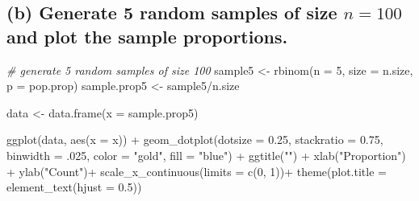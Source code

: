 \documentclass[
]{book}
\newenvironment{Shaded}{\begin{snugshade}}{\end{snugshade}}
\newcommand{\AttributeTok}[1]{\textcolor[rgb]{0.77,0.63,0.00}{#1}}
\newcommand{\CommentTok}[1]{\textcolor[rgb]{0.56,0.35,0.01}{\textit{#1}}}
\newcommand{\DecValTok}[1]{\textcolor[rgb]{0.00,0.00,0.81}{#1}}
\newcommand{\FloatTok}[1]{\textcolor[rgb]{0.00,0.00,0.81}{#1}}
\newcommand{\FunctionTok}[1]{\textcolor[rgb]{0.00,0.00,0.00}{#1}}
\newcommand{\NormalTok}[1]{#1}
\newcommand{\OtherTok}[1]{\textcolor[rgb]{0.56,0.35,0.01}{#1}}
\newcommand{\SpecialCharTok}[1]{\textcolor[rgb]{0.00,0.00,0.00}{#1}}
\newcommand{\StringTok}[1]{\textcolor[rgb]{0.31,0.60,0.02}{#1}}
\begin{document}
\hypertarget{b-generate-5-random-samples-of-size-n-100-and-plot-the-sample-proportions.}{%
\subsection{\texorpdfstring{(b) Generate 5 random samples of size \(n= 100\) and plot the sample proportions.}{(b) Generate 5 random samples of size n= 100 and plot the sample proportions.}}\label{b-generate-5-random-samples-of-size-n-100-and-plot-the-sample-proportions.}}

\begin{Shaded}
\begin{Highlighting}[]
\CommentTok{\# generate 5 random samples of size 100}
\NormalTok{sample5 }\OtherTok{\textless{}{-}} \FunctionTok{rbinom}\NormalTok{(}\AttributeTok{n =} \DecValTok{5}\NormalTok{, }\AttributeTok{size =}\NormalTok{ n.size, }\AttributeTok{p =}\NormalTok{ pop.prop)  }
\NormalTok{sample.prop5 }\OtherTok{\textless{}{-}}\NormalTok{ sample5}\SpecialCharTok{/}\NormalTok{n.size }

\NormalTok{data }\OtherTok{\textless{}{-}} \FunctionTok{data.frame}\NormalTok{(}\AttributeTok{x =}\NormalTok{ sample.prop5)}

\FunctionTok{ggplot}\NormalTok{(data, }\FunctionTok{aes}\NormalTok{(}\AttributeTok{x =}\NormalTok{ x)) }\SpecialCharTok{+}
   \FunctionTok{geom\_dotplot}\NormalTok{(}\AttributeTok{dotsize =} \FloatTok{0.25}\NormalTok{,}
               \AttributeTok{stackratio =} \FloatTok{0.75}\NormalTok{,}
               \AttributeTok{binwidth =}\NormalTok{ .}\DecValTok{025}\NormalTok{,}
               \AttributeTok{color =} \StringTok{"gold"}\NormalTok{,}
               \AttributeTok{fill =} \StringTok{"blue"}\NormalTok{) }\SpecialCharTok{+}
  \FunctionTok{ggtitle}\NormalTok{(}\StringTok{""}\NormalTok{) }\SpecialCharTok{+}  \FunctionTok{xlab}\NormalTok{(}\StringTok{"Proportion"}\NormalTok{) }\SpecialCharTok{+} \FunctionTok{ylab}\NormalTok{(}\StringTok{"Count"}\NormalTok{)}\SpecialCharTok{+}
  \FunctionTok{scale\_x\_continuous}\NormalTok{(}\AttributeTok{limits =} \FunctionTok{c}\NormalTok{(}\DecValTok{0}\NormalTok{, }\DecValTok{1}\NormalTok{))}\SpecialCharTok{+} 
  \FunctionTok{theme}\NormalTok{(}\AttributeTok{plot.title =} \FunctionTok{element\_text}\NormalTok{(}\AttributeTok{hjust =} \FloatTok{0.5}\NormalTok{))}
\end{Highlighting}
\end{Shaded}
\end{document}
